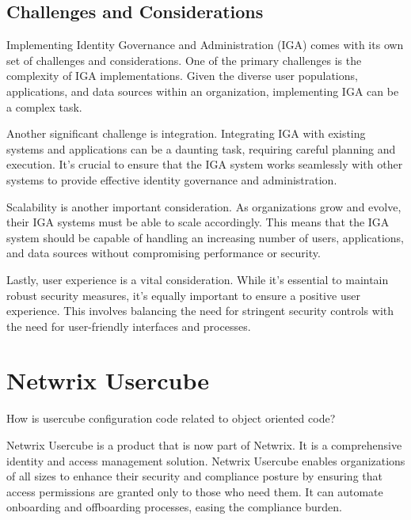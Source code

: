 \subsection{Challenges and Considerations}


Implementing Identity Governance and Administration (IGA) comes with its own set of challenges and considerations. One of the primary challenges is the complexity of IGA implementations. Given the diverse user populations, applications, and data sources within an organization, implementing IGA can be a complex task.

Another significant challenge is integration. Integrating IGA with existing systems and applications can be a daunting task, requiring careful planning and execution. It’s crucial to ensure that the IGA system works seamlessly with other systems to provide effective identity governance and administration.

Scalability is another important consideration. As organizations grow and evolve, their IGA systems must be able to scale accordingly. This means that the IGA system should be capable of handling an increasing number of users, applications, and data sources without compromising performance or security.

Lastly, user experience is a vital consideration. While it’s essential to maintain robust security measures, it’s equally important to ensure a positive user experience. This involves balancing the need for stringent security controls with the need for user-friendly interfaces and processes.
















\section{Netwrix Usercube}


How is usercube configuration code related to object oriented code?

Netwrix Usercube is a product that is now part of Netwrix. It is a comprehensive identity and access management solution. Netwrix Usercube enables organizations of all sizes to enhance their security and compliance posture by ensuring that access permissions are granted only to those who need them. It can automate onboarding and offboarding processes, easing the compliance burden.

